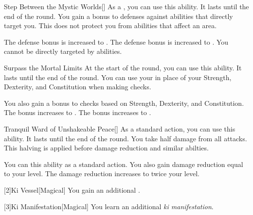 {            \begin{ability}{Step Between the Mystic Worlds}[]
                As a , you can use this ability.
                It lasts until the end of the round.
                You gain a  bonus to defenses against  abilities that directly target you.
                This does not protect you from abilities that affect an area.

                \rankline
                 The defense bonus is increased to .
                 The defense bonus is increased to .
                 You cannot be directly targeted by  abilities.
            \end{ability}

            \begin{ability}{Surpass the Mortal Limits}
                At the start of the round, you can use this ability.
                It lasts until the end of the round.
                You can use your  in place of your Strength, Dexterity, and Constitution when making checks.

                \rankline
                 You also gain a  bonus to checks based on Strength, Dexterity, and Constitution.
                 The bonus increases to .
                 The bonus increases to .
            \end{ability}

            \begin{ability}{Tranquil Ward of Unshakeable Peace}[]
                As a standard action, you can use this ability.
                It lasts until the end of the round.
                You take half damage from all attacks.
                This halving is applied before damage reduction and similar abilties.

                \rankline
                 You can  this ability as a standard action.
                 You also gain damage reduction equal to your level.
                 The damage reduction increases to twice your level.
            \end{ability}
        }

        [2]{Ki Vessel}[Magical] You gain an additional .

        [3]{Ki Manifestation}[Magical]
        You learn an additional \textit{ki manifestation}.

